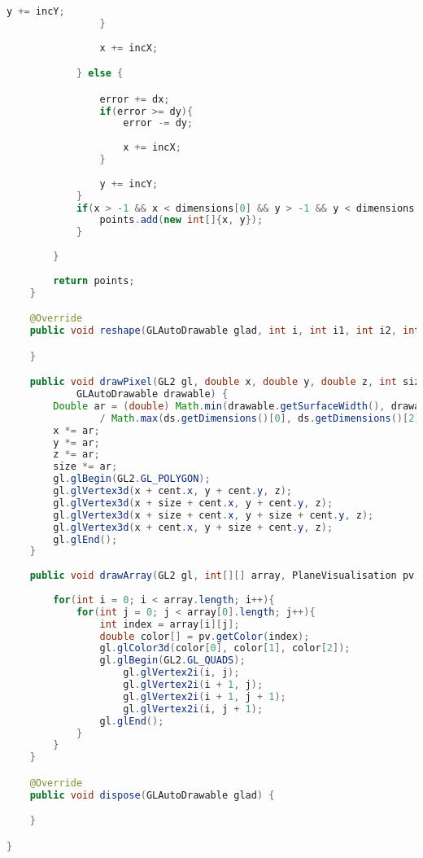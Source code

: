 \documentclass[pdftex,a4paper,10pt,titlepage]{article}
\begin{document}
\begin{lstlisting}[language=java, breaklines=true]
                    y += incY;
                }
                
                x += incX;

            } else {

                error += dx;
                if(error >= dy){
                    error -= dy;
                    
                    x += incX;
                }
                
                y += incY;
            }
            if(x > -1 && x < dimensions[0] && y > -1 && y < dimensions[1]){
                points.add(new int[]{x, y});
            }
            
        }
       
        return points;
    }

    @Override
    public void reshape(GLAutoDrawable glad, int i, int i1, int i2, int i3) {

    }

    public void drawPixel(GL2 gl, double x, double y, double z, int size, Point2D.Double cent,
            GLAutoDrawable drawable) {
        Double ar = (double) Math.min(drawable.getSurfaceWidth(), drawable.getSurfaceHeight())
                / Math.max(ds.getDimensions()[0], ds.getDimensions()[2]);
        x *= ar;
        y *= ar;
        z *= ar;
        size *= ar;
        gl.glBegin(GL2.GL_POLYGON);
        gl.glVertex3d(x + cent.x, y + cent.y, z);
        gl.glVertex3d(x + size + cent.x, y + cent.y, z);
        gl.glVertex3d(x + size + cent.x, y + size + cent.y, z);
        gl.glVertex3d(x + cent.x, y + size + cent.y, z);
        gl.glEnd();
    }
    
    public void drawArray(GL2 gl, int[][] array, PlaneVisualisation pv){
        
        for(int i = 0; i < array.length; i++){
            for(int j = 0; j < array[0].length; j++){
                int index = array[i][j];
                double color[] = pv.getColor(index);
                gl.glColor3d(color[0], color[1], color[2]);
                gl.glBegin(GL2.GL_QUADS);
                    gl.glVertex2i(i, j);
                    gl.glVertex2i(i + 1, j);
                    gl.glVertex2i(i + 1, j + 1);
                    gl.glVertex2i(i, j + 1);
                gl.glEnd();
            }
        }
    }

    @Override
    public void dispose(GLAutoDrawable glad) {

    }

}

\end{lstlisting}
\end{document}
